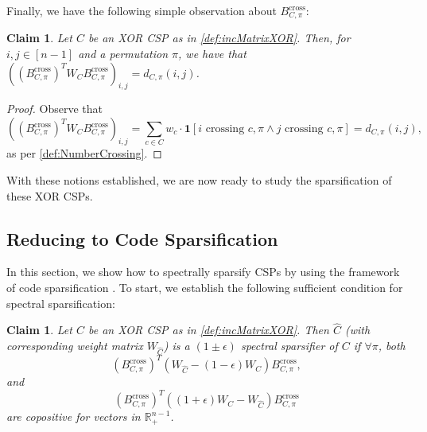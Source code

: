 \documentclass[11pt]{article}
\newtheorem{claim}[theorem]{Claim}
\theoremstyle{definition}
\newcommand{\R}{\mathbb{R}}
\newcommand{\eps}{\epsilon}
\begin{document}
Finally, we have the following simple observation about $B^{\text{cross}}_{C, \pi}$:

\begin{claim}\label{clm:crossingNumberCrossingMatrix}
	Let $C$ be an XOR CSP as in \cref{def:incMatrixXOR}. Then, for $i, j \in [n-1]$ and a permutation $\pi$, we have that $((B^{\text{cross}}_{C, \pi})^T W_C B^{\text{cross}}_{C, \pi})_{i,j} = d_{C, \pi}(i,j)$.
\end{claim}

\begin{proof}
	Observe that 
	\[
	((B^{\text{cross}}_{C, \pi})^T W_C B^{\text{cross}}_{C, \pi})_{i,j} = \sum_{c \in C} w_c \cdot \mathbf{1}[i \text{ crossing } c,\pi \wedge j \text{ crossing } c,\pi] = d_{C, \pi}(i,j),
	\]
    as per \cref{def:NumberCrossing}.
\end{proof}

With these notions established, we are now ready to study the sparsification of these XOR CSPs.

\subsection{Reducing to Code Sparsification}

In this section, we show how to spectrally sparsify CSPs by using the framework of code sparsification \cite{KPS24, KPS24c}. To start, we establish the following sufficient condition for spectral sparsification:

\begin{claim}\label{clm:copositiveMatrix}
	Let $C$ be an XOR CSP as in \cref{def:incMatrixXOR}. Then $\hat{C}$ (with corresponding weight matrix $W_{\hat{C}}$) is a $(1 \pm \eps)$ spectral sparsifier of $C$ if $\forall \pi$, both
	\[
	(B^{\text{cross}}_{C, \pi})^T (W_{\hat{C}} - (1 - \eps)W_C) B^{\text{cross}}_{C, \pi},
	\]
	and 
	\[
	(B^{\text{cross}}_{C, \pi})^T ((1 + \eps)W_C - W_{\hat{C}} ) B^{\text{cross}}_{C, \pi} 
	\]
	are copositive for vectors in $\R^{n-1}_+$.
\end{claim}
\end{document}
